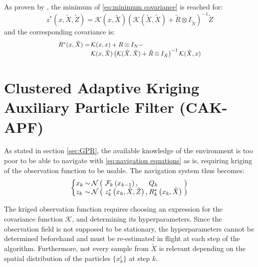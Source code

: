 \documentclass[conference]{IEEEtran}
\begin{document}
As proven by \cite{bib:Rasmussen}, the minimum of \eqref{eq:minimum covariance} is reached for:
\begin{equation}
z^*(x,\tilde{X},\tilde{Z})=\mathcal{K}(x,\tilde{X})\left(\mathcal{K}(\tilde{X},\tilde{X})+\tilde{R}\otimes I_{\tilde{N}}\right)^{-1}\tilde{Z}
\end{equation}
and the corresponding covariance is:
\begin{equation}
\setlength\arraycolsep{1pt}
\scalebox{0.9}{$\begin{matrix*}[l]
R^*(x,\tilde{X})=&\mathcal{K}(x,x)+R\otimes I_N-\\&\mathcal{K}(x,\tilde{X})\left(\mathcal{K}(\tilde{X},\tilde{X})+\tilde{R}\otimes I_{\tilde{N}}\right)^{-1}\mathcal{K}(\tilde{X},x)
\end{matrix*}$}
\end{equation}

\section{Clustered Adaptive Kriging Auxiliary Particle Filter (CAK-APF)}

As stated in section \ref{sec:GPR}, the available knowledge of the environment is too poor to be able to navigate with \eqref{eq:navigation equations} as is, requiring kriging of the observation function to be usable. The navigation system thus becomes:
\begin{equation}
\setlength\arraycolsep{1pt}
\left\{\begin{matrix*}[l]
x_k&\sim&\mathcal{N}\left(\vphantom{\tilde{X}}\right.&\mathcal{F}_k\left(x_{k-1}\right),&Q_k&\left.\vphantom{\tilde{X}}\right)\\
z_k&\sim&\mathcal{N}\left(\vphantom{\tilde{X}}\right.&z^*_k\left(x_k,\tilde{X},\tilde{Z}\right),&R^*_k\left(x_k,\tilde{X}\right)&\left.\vphantom{\tilde{X}}\right)
\end{matrix*}\right.\label{eq:kriged navigation}
\end{equation}

The kriged observation function requires choosing an expression for the covariance function $\mathcal{K}$, and determining its hyperparameters. Since the observation field is not supposed to be stationary, the hyperparameters cannot be determined beforehand and must be re-estimated in flight at each step of the algorithm. Furthermore, not every sample from $\tilde{X}$ is relevant depending on the spatial distribution of the particles $\{x_k^i\}$ at step $k$.
\end{document}

